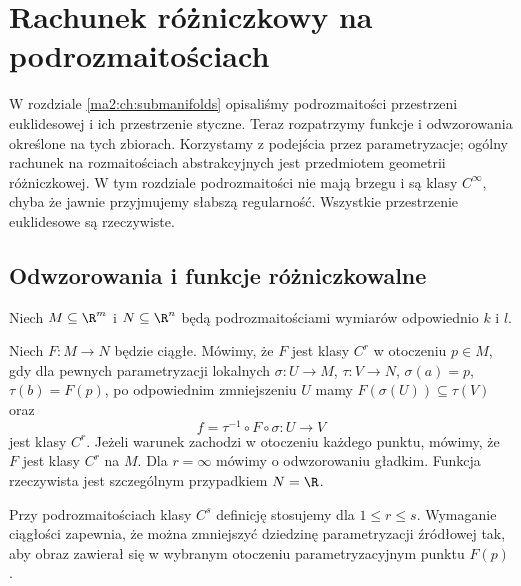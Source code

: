 \chapter{Rachunek różniczkowy na podrozmaitościach}
\label{ma2:ch:manifold-calculus}

W rozdziale \ref{ma2:ch:submanifolds} opisaliśmy podrozmaitości
przestrzeni euklidesowej i ich przestrzenie styczne. Teraz
rozpatrzymy funkcje i odwzorowania określone na tych zbiorach.
Korzystamy z podejścia przez parametryzacje; ogólny rachunek
na rozmaitościach abstrakcyjnych jest przedmiotem geometrii
różniczkowej. W tym rozdziale podrozmaitości nie mają brzegu
i są klasy $C^\infty$, chyba że jawnie przyjmujemy słabszą
regularność. Wszystkie przestrzenie euklidesowe są rzeczywiste.

\section{Odwzorowania i funkcje różniczkowalne}

Niech $M\subseteq\R^m$ i $N\subseteq\R^n$ będą
podrozmaitościami wymiarów odpowiednio $k$ i $l$.

\begin{definicja}
\label{ma2:def:smooth-map-manifolds}
Niech $F:M\to N$ będzie ciągłe. Mówimy, że $F$ jest klasy
$C^r$ w otoczeniu $p\in M$, gdy dla pewnych parametryzacji
lokalnych $\sigma:U\to M$, $\tau:V\to N$,
$\sigma(a)=p$, $\tau(b)=F(p)$, po odpowiednim zmniejszeniu
$U$ mamy $F(\sigma(U))\subseteq\tau(V)$ oraz
\[
 f=\tau^{-1}\circ F\circ\sigma:U\to V
\]
jest klasy $C^r$. Jeżeli warunek zachodzi w otoczeniu każdego
punktu, mówimy, że $F$ jest klasy $C^r$ na $M$.
Dla $r=\infty$ mówimy o odwzorowaniu gładkim.
Funkcja rzeczywista jest szczególnym przypadkiem $N=\R$.
\end{definicja}

Przy podrozmaitościach klasy $C^s$ definicję stosujemy dla
$1\le r\le s$. Wymaganie ciągłości zapewnia, że można
zmniejszyć dziedzinę parametryzacji źródłowej tak, aby
obraz zawierał się w wybranym otoczeniu parametryzacyjnym
punktu $F(p)$.

